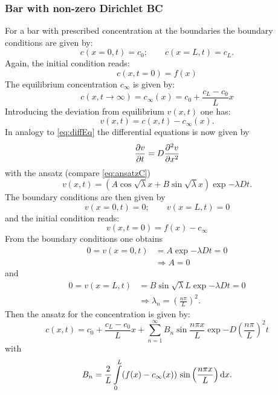 \subsubsection{Bar with non-zero Dirichlet BC}
For a bar with prescribed concentration at the boundaries the boundary conditions are given by:
\begin{equation}
  c(x=0,t) = c_0; \qquad c(x=L,t)= c_L.
\end{equation}
Again, the initial condition reads:
\begin{equation}
  c(x,t=0) = f(x)
\end{equation}
The equilibrium concentration $c_{\infty}$ is given by:
\begin{equation}
  c(x,t \rightarrow \infty) = c_\infty(x) = c_0 + \frac{c_L-c_0}{L}x 
\end{equation}
Introducing the deviation from equilibrium $v(x,t)$ one has:
\begin{equation}
  v(x,t) = c(x,t) - c_\infty(x).
\end{equation}
In analogy to \cref{eq:diffEq} the differential equations is now given by 
\begin{equation}
  \frac{\partial v}{\partial t} = D \frac{\partial^2 v}{\partial {x}^2} 
\end{equation}
with the ansatz (compare \cref{eq:ansatzC})
\begin{equation}
  v(x,t) = \left( A \cos{\sqrt{\lambda}x} + B \sin{\sqrt{\lambda}x} \right) \exp{-\lambda Dt}.
\end{equation}
The boundary conditions are then given by
\begin{equation}
  v(x=0,t) = 0; \qquad v(x=L,t) = 0
\end{equation}
and the initial condition reads:
\begin{equation}
  v(x,t=0) = f(x) - c_\infty
\end{equation}
From the boundary conditions one obtains
\begin{equation}
  \begin{split}
    0 = v(x=0,t) &= A \exp{-\lambda Dt} = 0 \\
    &\Rightarrow A = 0
  \end{split}
\end{equation}
and
\begin{equation}
  \begin{split}
    0 = v(x=L,t) &= B \sin{\sqrt{\lambda} L} \exp{-\lambda Dt} = 0 \\
    &\Rightarrow \lambda_n = \left(\frac{n\pi}{L}\right)^2.
  \end{split}
\end{equation}
Then the ansatz for the concentration is given by:
\begin{equation}
  c(x,t) = c_0 + \frac{c_L-c_0}{L}x + \sum_{n=1}^{\infty} B_n \sin{\frac{n\pi x}{L}} \exp{-D\left(\frac{n\pi}{L}\right)^2 t}
\end{equation}
with
\begin{equation}
  B_n = \frac{2}{L} \int\limits_0^L (f(x)-c_\infty(x)) \ {\rm sin}\left( {\frac{n\pi x}{L}} \right) {\rm d} x.
\end{equation}

